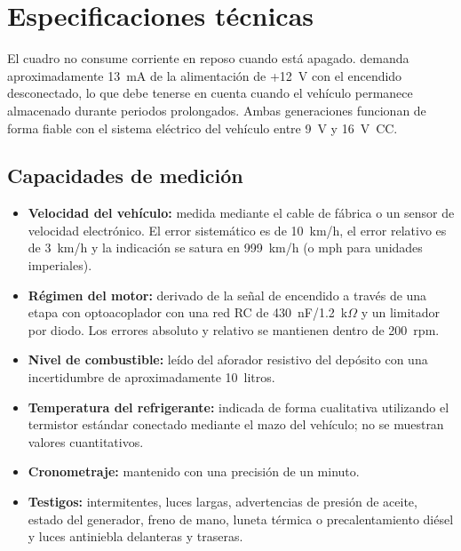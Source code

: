 \chapter{Especificaciones técnicas}\label{ch:technical-specs}

El cuadro \ReplicaGenOne{} no consume corriente en reposo cuando está apagado. \ReplicaNextShort{} demanda aproximadamente 13~mA de la alimentación de +12~V con el encendido desconectado, lo que debe tenerse en cuenta cuando el vehículo permanece almacenado durante periodos prolongados. Ambas generaciones funcionan de forma fiable con el sistema eléctrico del vehículo entre 9~V y 16~V~CC.

\section{Capacidades de medición}
\begin{itemize}
    \item \textbf{Velocidad del vehículo:} medida mediante el cable de fábrica o un sensor de velocidad electrónico. El error sistemático es de 10~km/h, el error relativo es de 3~km/h y la indicación se satura en 999~km/h (o mph para unidades imperiales).
    \item \textbf{Régimen del motor:} derivado de la señal de encendido a través de una etapa con optoacoplador con una red RC de 430~nF/1.2~k\ensuremath{\Omega} y un limitador por diodo. Los errores absoluto y relativo se mantienen dentro de 200~rpm.
    \item \textbf{Nivel de combustible:} leído del aforador resistivo del depósito con una incertidumbre de aproximadamente 10~litros.
    \item \textbf{Temperatura del refrigerante:} indicada de forma cualitativa utilizando el termistor estándar conectado mediante el mazo del vehículo; no se muestran valores cuantitativos.
    \item \textbf{Cronometraje:} mantenido con una precisión de un minuto.
    \item \textbf{Testigos:} intermitentes, luces largas, advertencias de presión de aceite, estado del generador, freno de mano, luneta térmica o precalentamiento diésel y luces antiniebla delanteras y traseras.
\end{itemize}
